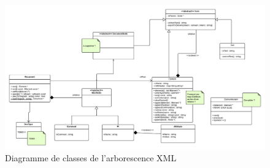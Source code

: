 \begin{landscape}
\begin{figure}[h!]
    \centering
    \includegraphics[width=\linewidth]{images/classDiagram.png}
    \caption{Diagramme de classes de l'arborescence XML}
    \label{classDiagram}
\end{figure}
\end{landscape}
